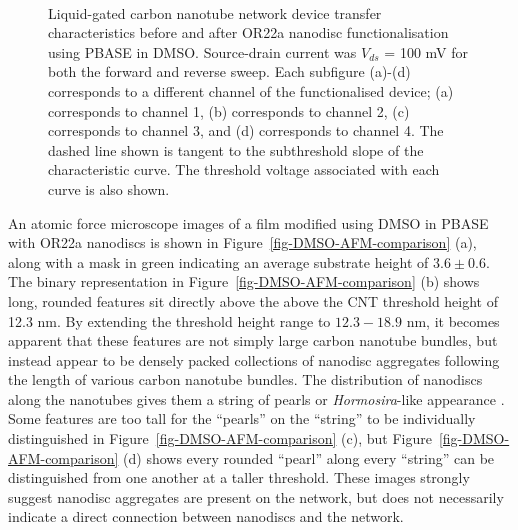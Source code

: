 \documentclass[
  a4paper,
]{scrbook}
\begin{document}
\begin{figure}
\begin{minipage}[t]{0.45\linewidth}
{{}

}

\end{minipage}%
%
\begin{minipage}[t]{0.01\linewidth}

{\centering 

~

}

\end{minipage}%

\caption{\label{fig-DMSO-TX}Liquid-gated carbon nanotube network device
transfer characteristics before and after OR22a nanodisc
functionalisation using PBASE in DMSO. Source-drain current was
\(V_{ds}\) = 100 mV for both the forward and reverse sweep. Each
subfigure (a)-(d) corresponds to a different channel of the
functionalised device; (a) corresponds to channel 1, (b) corresponds to
channel 2, (c) corresponds to channel 3, and (d) corresponds to channel
4. The dashed line shown is tangent to the subthreshold slope of the
characteristic curve. The threshold voltage associated with each curve
is also shown.}

\end{figure}

An atomic force microscope images of a film modified using DMSO in PBASE
with OR22a nanodiscs is shown in Figure~\ref{fig-DMSO-AFM-comparison}
(a), along with a mask in green indicating an average substrate height
of \(3.6\pm0.6\). The binary representation in
Figure~\ref{fig-DMSO-AFM-comparison} (b) shows long, rounded features
sit directly above the above the CNT threshold height of 12.3 nm. By
extending the threshold height range to \(12.3-18.9\) nm, it becomes
apparent that these features are not simply large carbon nanotube
bundles, but instead appear to be densely packed collections of nanodisc
aggregates following the length of various carbon nanotube bundles. The
distribution of nanodiscs along the nanotubes gives them a string of
pearls or \emph{Hormosira}-like appearance
\autocite{NewZealandPlantConservationNetwork}. Some features are too
tall for the ``pearls'' on the ``string'' to be individually
distinguished in Figure~\ref{fig-DMSO-AFM-comparison} (c), but
Figure~\ref{fig-DMSO-AFM-comparison} (d) shows every rounded ``pearl''
along every ``string'' can be distinguished from one another at a taller
threshold. These images strongly suggest nanodisc aggregates are present
on the network, but does not necessarily indicate a direct connection
between nanodiscs and the network.
\end{document}
